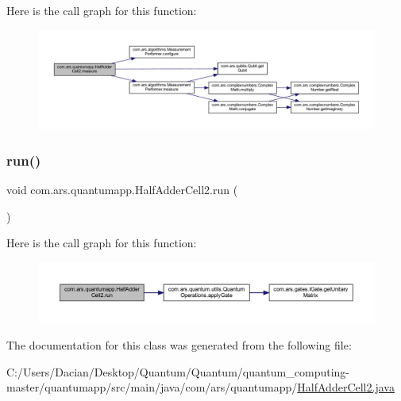 Here is the call graph for this function\+:
\nopagebreak
\begin{figure}[H]
\begin{center}
\leavevmode
\includegraphics[width=350pt]{classcom_1_1ars_1_1quantumapp_1_1_half_adder_cell2_ace7018ecff35605ac317049d2584db13_cgraph}
\end{center}
\end{figure}
\hypertarget{classcom_1_1ars_1_1quantumapp_1_1_half_adder_cell2_a4552a018b3fdd228fb7d851be827754c}{}\label{classcom_1_1ars_1_1quantumapp_1_1_half_adder_cell2_a4552a018b3fdd228fb7d851be827754c} 
\subsubsection{\texorpdfstring{run()}{run()}}
{\footnotesize\ttfamily void com.\+ars.\+quantumapp.\+Half\+Adder\+Cell2.\+run (\begin{DoxyParamCaption}{ }\end{DoxyParamCaption})}

Here is the call graph for this function\+:
\nopagebreak
\begin{figure}[H]
\begin{center}
\leavevmode
\includegraphics[width=350pt]{classcom_1_1ars_1_1quantumapp_1_1_half_adder_cell2_a4552a018b3fdd228fb7d851be827754c_cgraph}
\end{center}
\end{figure}


The documentation for this class was generated from the following file\+:\begin{DoxyCompactItemize}
\item 
C\+:/\+Users/\+Dacian/\+Desktop/\+Quantum/\+Quantum/quantum\+\_\+computing-\/master/quantumapp/src/main/java/com/ars/quantumapp/\hyperlink{_half_adder_cell2_8java}{Half\+Adder\+Cell2.\+java}\end{DoxyCompactItemize}
